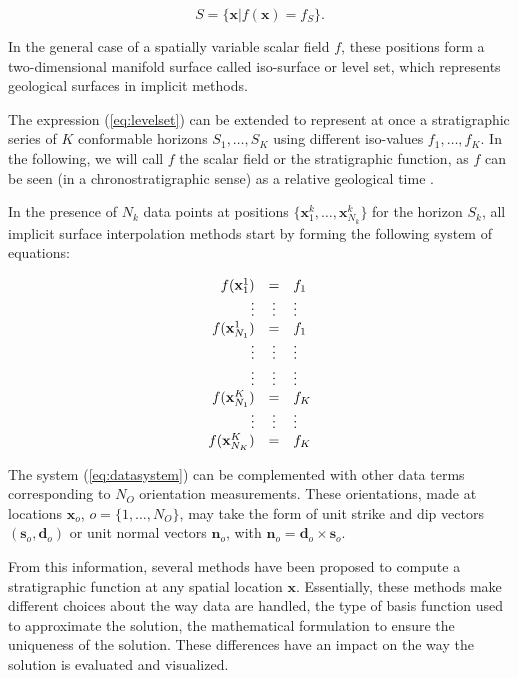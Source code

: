 \documentclass[preprint]{ring20}
\newcommand{\bx}{\mathbf{x}}
\newcommand{\bn}{\mathbf{n}}
\begin{document}
\begin{equation}
\label{eq:levelset}
  S = \{\mathbf{x} | f(\mathbf{x}) = f_S\}.
\end{equation}

In the general case of a spatially variable scalar field $f$, these positions form a two-dimensional manifold surface called iso-surface or level set, which represents geological surfaces in implicit methods. 

The expression (\ref{eq:levelset}) can be extended to represent 
at once a stratigraphic series of $K$ conformable horizons 
$S_1, \ldots, S_K$ using different iso-values $f_1, \ldots, f_K$. 
In the following, we will call $f$ the scalar field or the stratigraphic function, as $f$ can be seen 
(in a chronostratigraphic sense) as a relative geological time \citep{Mallet2004MG,Lomask2006G,Wu2012G}.

In the presence of $N_k$ data points at positions $\{\mathbf{x}_1^k, \ldots, \mathbf{x}_{N_k}^k\}$ for the horizon $S_k$, all implicit surface interpolation methods start by forming the following system of equations: 

\begin{equation}
\label{eq:datasystem}
\begin{array}{r c l}
f(\bx_1^1) & = & f_1 \\
\vdots & \vdots & \vdots \\
f(\bx_{N_1}^1) & = & f_1 \\
\vdots & \vdots & \vdots \\
\vdots & \vdots & \vdots \\
f(\bx_{N_1}^K) & = & f_K \\
\vdots & \vdots & \vdots \\
f(\bx_{N_K}^K) & = & f_K \\
\end{array}
\end{equation}

The system (\ref{eq:datasystem}) can be complemented with other data terms corresponding to $N_O$ orientation measurements. These orientations, made at locations 
$\bx_o$, $o = \{1, \ldots, N_O\}$, may take the form of unit strike and dip vectors $(\mathbf{s}_o, \mathbf{d}_o)$ or unit normal vectors $\bn_o$, with $\mathbf{n}_o = \mathbf{d}_o \times \mathbf{s}_o$.  
 
From this information, several methods have been proposed to compute a stratigraphic function at any spatial location $\mathbf{x}$. Essentially, these methods make different choices about the way data are handled, the type of basis function used to approximate the solution, the mathematical formulation to ensure the uniqueness of the solution. These differences have an impact on the way the solution is evaluated and visualized. 
 
\end{document}
